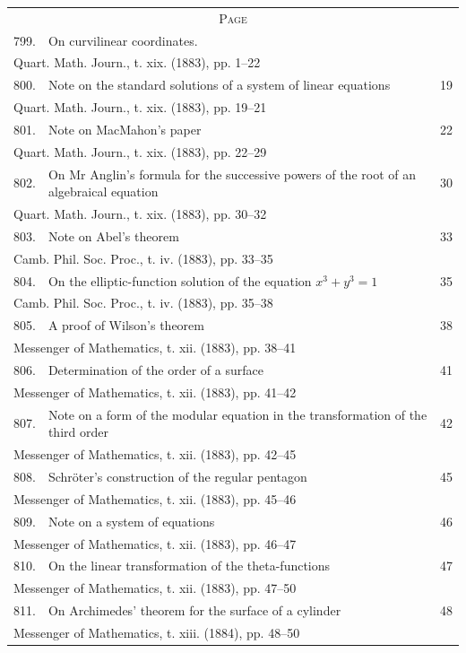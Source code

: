 \documentclass[11pt,a4paper]{article}
\theoremstyle{definition}
\theoremstyle{remark}
\begin{document}
\noindent
\begin{tabular}{@{}r@{\quad}p{8cm}@{\quad}r@{}}
\multicolumn{3}{c}{\scshape Page}\\[2mm]
799. & On curvilinear coordinates. & \\
\multicolumn{3}{l}{\quad Quart. Math. Journ., t. xix. (1883), pp. 1--22}\\[1mm]
800. & Note on the standard solutions of a system of linear equations & 19 \\
\multicolumn{3}{l}{\quad Quart. Math. Journ., t. xix. (1883), pp. 19--21}\\[1mm]
801. & Note on MacMahon's paper & 22 \\
\multicolumn{3}{l}{\quad Quart. Math. Journ., t. xix. (1883), pp. 22--29}\\[1mm]
802. & On Mr Anglin's formula for the successive powers of the root of an algebraical equation & 30 \\
\multicolumn{3}{l}{\quad Quart. Math. Journ., t. xix. (1883), pp. 30--32}\\[1mm]
803. & Note on Abel's theorem & 33 \\
\multicolumn{3}{l}{\quad Camb. Phil. Soc. Proc., t. iv. (1883), pp. 33--35}\\[1mm]
804. & On the elliptic-function solution of the equation $x^3 + y^3 = 1$ & 35 \\
\multicolumn{3}{l}{\quad Camb. Phil. Soc. Proc., t. iv. (1883), pp. 35--38}\\[1mm]
805. & A proof of Wilson's theorem & 38 \\
\multicolumn{3}{l}{\quad Messenger of Mathematics, t. xii. (1883), pp. 38--41}\\[1mm]
806. & Determination of the order of a surface & 41 \\
\multicolumn{3}{l}{\quad Messenger of Mathematics, t. xii. (1883), pp. 41--42}\\[1mm]
807. & Note on a form of the modular equation in the transformation of the third order & 42 \\
\multicolumn{3}{l}{\quad Messenger of Mathematics, t. xii. (1883), pp. 42--45}\\[1mm]
808. & Schr\"{o}ter's construction of the regular pentagon & 45 \\
\multicolumn{3}{l}{\quad Messenger of Mathematics, t. xii. (1883), pp. 45--46}\\[1mm]
809. & Note on a system of equations & 46 \\
\multicolumn{3}{l}{\quad Messenger of Mathematics, t. xii. (1883), pp. 46--47}\\[1mm]
810. & On the linear transformation of the theta-functions & 47 \\
\multicolumn{3}{l}{\quad Messenger of Mathematics, t. xii. (1883), pp. 47--50}\\[1mm]
811. & On Archimedes' theorem for the surface of a cylinder & 48 \\
\multicolumn{3}{l}{\quad Messenger of Mathematics, t. xiii. (1884), pp. 48--50}\\[1mm]
\end{tabular}
\cleardoublepage
\end{document}
